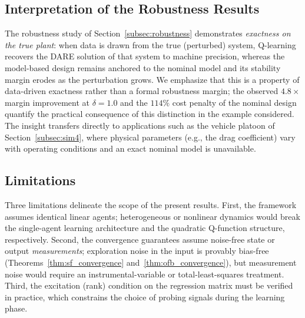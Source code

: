 \documentclass[12pt]{elsarticle}
\theoremstyle{remark}
\begin{document}
\subsection{Interpretation of the Robustness Results}
\label{subsec:robust_disc}
The robustness study of Section~\ref{subsec:robustness} demonstrates \emph{exactness on the true plant}: when data is drawn from the true (perturbed) system, Q-learning recovers the DARE solution of that system to machine precision, whereas the model-based design remains anchored to the nominal model and its stability margin erodes as the perturbation grows. We emphasize that this is a property of data-driven exactness rather than a formal robustness margin; the observed $4.8\times$ margin improvement at $\delta = 1.0$ and the $114\%$ cost penalty of the nominal design quantify the practical consequence of this distinction in the example considered. The insight transfers directly to applications such as the vehicle platoon of Section~\ref{subsec:sim4}, where physical parameters (e.g., the drag coefficient) vary with operating conditions and an exact nominal model is unavailable.
\subsection{Limitations}
\label{subsec:limitations}
Three limitations delineate the scope of the present results. First, the framework assumes identical linear agents; heterogeneous or nonlinear dynamics would break the single-agent learning architecture and the quadratic Q-function structure, respectively. Second, the convergence guarantees assume noise-free state or output \emph{measurements}; exploration noise in the input is provably bias-free (Theorems~\ref{thm:sf_convergence} and~\ref{thm:ofb_convergence}), but measurement noise would require an instrumental-variable or total-least-squares treatment. Third, the excitation (rank) condition on the regression matrix must be verified in practice, which constrains the choice of probing signals during the learning phase.
\end{document}
